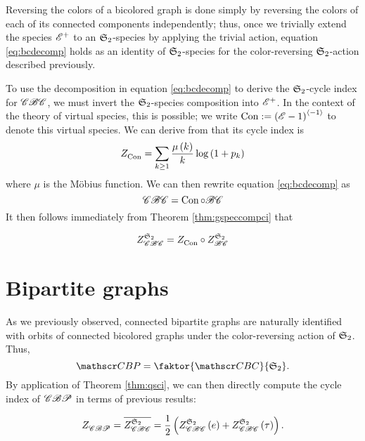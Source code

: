 \documentclass[distribution,draft]{brandiss} %
\numberwithin{section}{chapter}
\numberwithin{figure}{chapter}
\begin{document}
Reversing the colors of a bicolored graph is done simply by reversing the colors of each of its connected components independently; thus, once we trivially extend the species $\specname{E}^{+}$ to an $\symgp{2}$-species by applying the trivial action, equation \eqref{eq:bcdecomp} holds as an identity of $\symgp{2}$-species for the color-reversing $\symgp{2}$-action described previously.

To use the decomposition in equation \eqref{eq:bcdecomp} to derive the $\symgp{2}$-cycle index for $\specname{CBC}$, we must invert the $\symgp{2}$-species composition into $\specname{E}^{+}$.
In the context of the theory of virtual species, this is possible; we write $\con := \pbrac{\specname{E} - 1}^{\abrac{-1}}$ to denote this virtual species.
We can derive from \cite[\S 2.5, eq.~(58c)]{bll:species} that its cycle index is
\begin{equation}
  \label{eq:zgamma}
  \ci{\con} = \sum_{k \geq 1} \frac{\mu \pbrac{k}}{k} \log \pbrac{1 + p_{k}}
\end{equation}
where $\mu$ is the M\"{o}bius function.
We can then rewrite equation \eqref{eq:bcdecomp} as
\[\specname{CBC} = \con \circ \specname{BC}\]
It then follows immediately from Theorem \ref{thm:gspeccompci} that
\begin{theorem}
  \begin{equation} \gci{\symgp{2}}{\specname{CBC}} = \ci{\con} \circ \gci{\symgp{2}}{\specname{BC}} \label{eq:zcbcdecomp} \end{equation}
\end{theorem}

\section{Bipartite graphs}\label{s:bp}
As we previously observed, connected bipartite graphs are naturally identified with orbits of connected bicolored graphs under the color-reversing action of $\symgp{2}$.
Thus,
\begin{equation*}
  \specname{CBP} = \faktor{\specname{CBC}}{\symgp{2}}.
\end{equation*}
By application of Theorem \ref{thm:qsci}, we can then directly compute the cycle index of $\specname{CBP}$ in terms of previous results:
\begin{theorem}
  \begin{equation}
    \ci{\specname{CBP}} = \qgci{\symgp{2}}{\specname{CBC}} = \frac{1}{2} \pbrac{\gcielt{\symgp{2}}{\specname{CBC}}{e} + \gcielt{\symgp{2}}{\specname{CBC}}{\tau}}.
  \end{equation}
\end{theorem}
\end{document}
